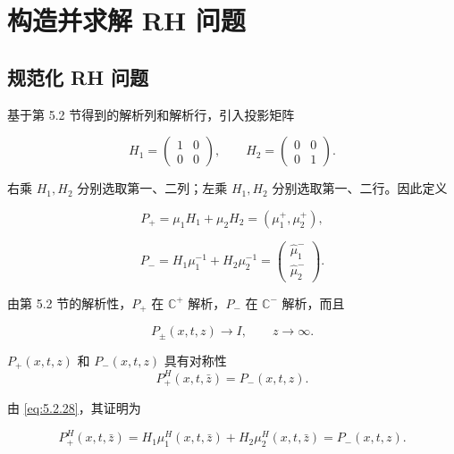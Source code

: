 \documentclass[
    lang=cn,
    scheme=chinese,
    mode=simple,
    device=normal,
    color=blue,
    math=cm,
    thmcnt=section,
    12pt
]{elegantbook}
\begin{document}
\section{构造并求解 RH 问题}

\subsection{规范化 RH 问题}

基于第 5.2 节得到的解析列和解析行，引入投影矩阵

\begin{equation}
    H_1=
    \begin{pmatrix}
        1 & 0 \\
        0 & 0
    \end{pmatrix},
    \qquad
    H_2=
    \begin{pmatrix}
        0 & 0 \\
        0 & 1
    \end{pmatrix}.
    \tag{5.3.1}
    \label{eq:5.3.1}
\end{equation}

右乘 $H_1,H_2$ 分别选取第一、二列；左乘 $H_1,H_2$ 分别选取第一、二行。因此定义

\[
    P_+
    =
    \mu_1H_1+\mu_2H_2
    =
    (\mu_1^+,\mu_2^+),
\]

\[
    P_-
    =
    H_1\mu_1^{-1}+H_2\mu_2^{-1}
    =
    \begin{pmatrix}
        \widehat\mu_1^- \\
        \widehat\mu_2^-
    \end{pmatrix}.
\]

由第 5.2 节的解析性，$P_+$ 在 $\mathbb{C}^+$ 解析，$P_-$ 在 $\mathbb{C}^-$ 解析，而且

\[
    P_\pm(x,t,z)\to I,\qquad z\to\infty.
\]

\setcounter{theorem}{1}
\begin{theorem}[RH 矩阵的共轭对称]
$P_+(x,t,z)$ 和 $P_-(x,t,z)$ 具有对称性
\begin{equation}
    P_+^H(x,t,\bar z)=P_-(x,t,z).
    \tag{5.3.2}
    \label{eq:5.3.2}
\end{equation}
\end{theorem}

由 \eqref{eq:5.2.28}，其证明为

\begin{equation}
    P_+^H(x,t,\bar z)
    =
    H_1\mu_1^H(x,t,\bar z)
    +
    H_2\mu_2^H(x,t,\bar z)
    =
    P_-(x,t,z).
    \tag{5.3.3}
    \label{eq:5.3.3}
\end{equation}
\end{document}
